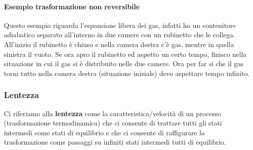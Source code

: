             \paragraph{Esempio trasformazione non reversibile}
                Questo esempio riguarda l'espansione libera dei gas, infatti ho un contenitore adiabatico separato all'interno in due camere con un rubinetto che le collega. All'inizio il rubinetto è chiuso e nella camera destra c'è gas, mentre in quella sinistra il vuoto. Se ora apro il rubinetto ed aspetto un certo tempo, finisco nella situazione in cui il gas si è distribuito nelle due camere. Ora per far si che il gas torni tutto nella camera destra (situazione iniziale) devo aspettare tempo infinito.

        \subsubsection{Lentezza}
            Ci riferiamo alla \textbf{lentezza} come la caratteristica/velocità di un processo (trasformazione termodinamica) che ci consente di trattare tutti gli stati intermedi come stati di equilibrio e che ci consente di raffigurare la trasformazione come passaggi su infiniti stati intermedi tutti di equilibrio.

